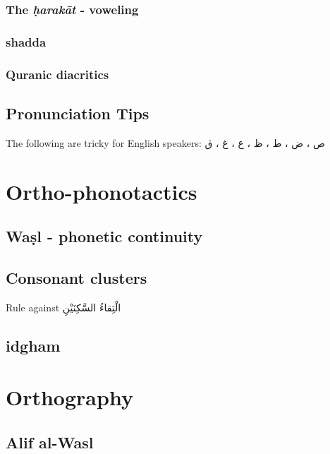 \documentclass[11pt]{article}
\begin{document}
\subsubsection{The \textit{ḥarakāt} - voweling}

\subsubsection{shadda}

\subsubsection{Quranic diacritics}

\subsection{Pronunciation Tips}

The following are tricky for English speakers: \textarabic{ص ، ض ، ط ،
  ظ ، ع ، غ ، ق}


\section{Ortho-phonotactics}

\subsection{Waṣl - phonetic continuity}

\subsection{Consonant clusters}

Rule against \textarabic{الْتِقاءُ السَّكِنَيْنِ}


\subsection{idgham}

\section{Orthography}

\subsection{Alif al-Wasl}
\end{document}
